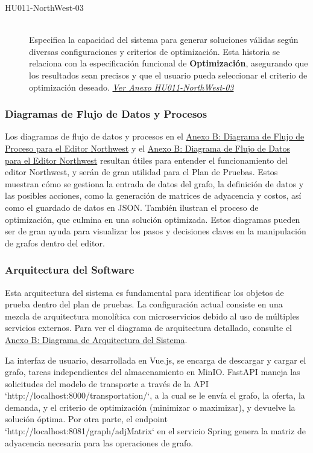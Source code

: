 \documentclass[stu, 12pt, letterpaper, donotrepeattitle, floatsintext, natbib]{apa7}
\begin{document}
\begin{description}
    \item[HU011-NorthWest-03] \hfill \\
    Especifica la capacidad del sistema para generar soluciones válidas según diversas configuraciones y criterios de optimización. Esta historia se relaciona con la especificación funcional de \textbf{Optimización}, asegurando que los resultados sean precisos y que el usuario pueda seleccionar el criterio de optimización deseado. \textit{\hyperref[tab:HU011-NorthWest-03]{Ver Anexo HU011-NorthWest-03}}

\end{description}

\subsubsection{Diagramas de Flujo de Datos y Procesos}

Los diagramas de flujo de datos y procesos en el \hyperref[tab:flowchart]{Anexo B: Diagrama de Flujo de Proceso para el Editor Northwest} y el \hyperref[tab:dataflow]{Anexo B: Diagrama de Flujo de Datos para el Editor Northwest} resultan útiles para entender el funcionamiento del editor Northwest, y serán de gran utilidad para el Plan de Pruebas. Estos muestran cómo se gestiona la entrada de datos del grafo, la definición de datos y las posibles acciones, como la generación de matrices de adyacencia y costos, así como el guardado de datos en JSON. También ilustran el proceso de optimización, que culmina en una solución optimizada. Estos diagramas pueden ser de gran ayuda para visualizar los pasos y decisiones claves en la manipulación de grafos dentro del editor.

\subsubsection{Arquitectura del Software}
Esta arquitectura del sistema es fundamental para identificar los objetos de prueba dentro del plan de pruebas. La configuración actual consiste en una mezcla de arquitectura monolítica con microservicios debido al uso de múltiples servicios externos. Para ver el diagrama de arquitectura detallado, consulte el \hyperref[fig:architecture]{Anexo B: Diagrama de Arquitectura del Sistema}.

La interfaz de usuario, desarrollada en Vue.js, se encarga de descargar y cargar el grafo, tareas independientes del almacenamiento en MinIO. FastAPI maneja las solicitudes del modelo de transporte a través de la API `http://localhost:8000/transportation/`, a la cual se le envía el grafo, la oferta, la demanda, y el criterio de optimización (minimizar o maximizar), y devuelve la solución óptima. Por otra parte, el endpoint `http://localhost:8081/graph/adjMatrix` en el servicio Spring genera la matriz de adyacencia necesaria para las operaciones de grafo.
\end{document}
